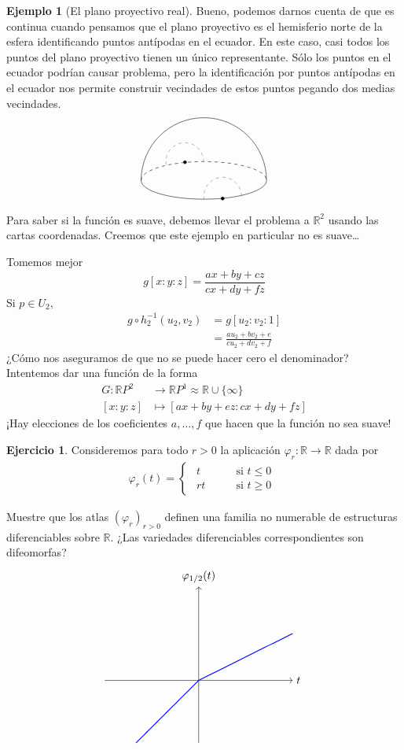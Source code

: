 \documentclass[spanish]{book}
\theoremstyle{definition}
\newtheorem*{ejer*}{Ejercicio}
\newtheorem*{ejem}{Ejemplo}
\newcommand{\R}{\mathbb{R}}
\begin{document}
\begin{ejem}[El plano proyectivo real]
	Bueno, podemos darnos cuenta de que es continua cuando pensamos que el plano proyectivo es el hemisferio norte de la esfera identificando puntos antípodas en el ecuador. En este caso, casi todos los puntos del plano proyectivo tienen un único representante. Sólo los puntos en el ecuador podrían causar problema, pero la identificación por puntos antípodas en el ecuador nos permite construir vecindades de estos puntos pegando dos medias vecindades.
	\[\begin{tikzpicture}[scale=2]
		\draw (-1,0) arc (180:0:1);
		\draw (-1,0) arc (180:360:1 and 0.3);
		\draw[dashed] (-1,0) arc (180:0:1 and 0.3);
		
		\filldraw (-.3,.29) circle (0.025);
		\filldraw (.3,-.29) circle (0.025);
		
		\draw[gray,dashed] (-.6,.25) arc (190:0:0.3);
		\draw[gray,dashed] (.6,-.25) arc (0:190:0.3);
	\end{tikzpicture}\]
	Para saber si la función es suave, debemos llevar el problema a $\R^2$ usando las cartas coordenadas. Creemos que este ejemplo en particular no es suave…
	
	Tomemos mejor
	\[g[x:y:z]=\frac{ax+by+cz}{cx+dy+fz}\]
	Si $p\in U_2$,
	\begin{align*}
		g\circ h_2^{-1}(u_2,v_2)&=g[u_2:v_2:1]\\
		&=\frac{au_2+bv_2+e}{cu_2+dv_2+f}
	\end{align*}
	¿Cómo nos aseguramos de que no se puede hacer cero el denominador? Intentemos dar una función de la forma
	\begin{align*}
		G:\R P^2&\to\R P^1\approx\R\cup\{\infty\}\\
		[x:y:z]&\mapsto[ax+by+ez:cx+dy+fz]
	\end{align*}
	¡Hay elecciones de los coeficientes $a,\ldots,f$ que hacen que la función no sea suave!
\end{ejem}
\begin{ejer*}
	Consideremos para todo $r>0$ la aplicación $\varphi_r:\R\to\R$ dada por
	\begin{align*}
		\varphi_r(t)=
		\begin{cases}
			\begin{aligned}
				t\qquad&\text{si }t\leq0\\
				rt\qquad&\text{si }t\geq0
			\end{aligned}
		\end{cases}
	\end{align*}
	
	Muestre que los atlas $(\varphi_r)_{r>0}$ definen una familia no numerable de estructuras diferenciables sobre $\R$. ¿Las variedades diferenciables correspondientes son difeomorfas?
	\[\begin{tikzpicture}
		\draw[->] (-3,0) -- (3,0) node[right] {$t$};
		\draw[->] (0,-2) -- (0,3) node[above] {$\varphi_{1/2}(t)$};
		
		\draw[blue, thick, domain=-2:0] plot (\x, \x);
		\draw[blue, thick, domain=0:3] plot (\x, 0.5*\x);
	\end{tikzpicture}\]
\end{ejer*}
\end{document}
